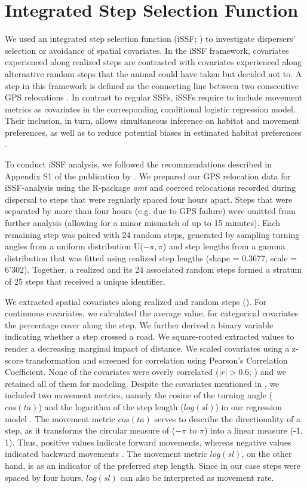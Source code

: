 \documentclass[abstract=off,10pt,a4paper,bibliography=totocnumbered]{article}
\begin{document}
\section{Integrated Step Selection Function}
We used an integrated step selection function (iSSF; \citealp{Avgar.2016}) to
investigate dispersers' selection or avoidance of spatial covariates. In the
iSSF framework, covariates experienced along realized steps are contrasted with
covariates experienced along alternative random steps that the animal could have
taken but decided not to. A step in this framework is defined as the connecting
line between two consecutive GPS relocations \citep{Turchin.1998}. In contrast
to regular SSFs, iSSFs require to include movement metrics as covariates in the
corresponding conditional logistic regression model. Their inclusion, in turn,
allows simultaneous inference on habitat and movement preferences, as well as to
reduce potential biases in estimated habitat preferences \citep{Forester.2009,
Warton.2013, Avgar.2016}.

To conduct iSSF analysis, we followed the recommendations described in Appendix
S1 of the publication by \cite{Avgar.2016}. We prepared our GPS relocation data
for iSSF-analysis using the R-package \textit{amt} \citep{Amt.2019} and coerced
relocations recorded during dispersal to steps that were regularly spaced four
hours apart. Steps that were separated by more than four hours (e.g. due to GPS
failure) were omitted from further analysis (allowing for a minor mismatch of up
to 15 minutes). Each remaining step was paired with 24 random steps, generated
by sampling turning angles from a uniform distribution U(\(-\pi, \pi\)) and step
lengths from a gamma distribution that was fitted using realized step lengths
(shape = 0.3677, scale = 6'302). Together, a realized and its 24 associated
random steps formed a stratum of 25 steps that received a unique identifier.

We extracted spatial covariates along realized and random steps
(). For continuous covariates, we calculated the average
value, for categorical covariates the percentage cover along the step. We
further derived a binary variable indicating whether a step crossed a road. We
square-rooted extracted values to render a decreasing marginal impact of
distance. We scaled covariates using a z-score transformation and screened for
correlation using Pearson's Correlation Coefficient. None of the covariates were
overly correlated (\(|r| > 0.6\); \citealp{Latham.2011}) and we retained all of
them for modeling. Despite the covariates mentioned in ,
we included two movement metrics, namely the cosine of the turning angle
(\(cos(ta)\)) and the logarithm of the step length (\(log(sl)\)) in our
regression model \citep{Avgar.2016}. The movement metric \(cos(ta)\) serves to
describe the directionality of a step, as it transforms the circular measure of
(\(-\pi\) to \(\pi\)) into a linear measure (-1, 1). Thus, positive values
indicate forward movements, whereas negative values indicated backward movements
\citep{Turchin.1998}. The movement metric \(log(sl)\), on the other hand, is as
an indicator of the preferred step length. Since in our case steps were spaced
by four hours, \(log(sl)\) can also be interpreted as movement rate.
\end{document}
